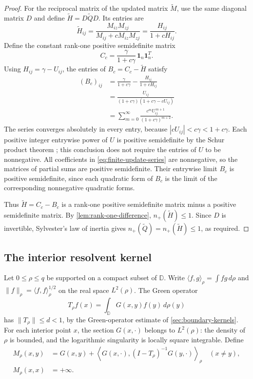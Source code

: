 \begin{proof}
For the reciprocal matrix of the updated matrix $\widetilde M$,
use the same diagonal matrix $D$ and define
$\widetilde H=D\widetilde QD$. Its entries are
\[
 \widetilde H_{ij}
 =\frac{M_{iz}M_{zj}}{M_{ij}+cM_{iz}M_{zj}}
 =\frac{H_{ij}}{1+cH_{ij}}.
\]
Define the constant rank-one positive semidefinite matrix
\[
 C_c=\frac{\gamma}{1+c\gamma}\,
                    \mathbf1_n\mathbf1_n^T.
\]
Using $H_{ij}=\gamma-U_{ij}$, the entries of
$B_c=C_c-\widetilde H$ satisfy
\begin{equation}\label{eq:finite-update-series}
 \begin{aligned}
 (B_c)_{ij}
 &=\frac{\gamma}{1+c\gamma}
                -\frac{H_{ij}}{1+cH_{ij}}\\
 &=\frac{U_{ij}}
        {(1+c\gamma)(1+c\gamma-cU_{ij})}\\
 &=\sum_{m=0}^\infty
       \frac{c^m U_{ij}^{\,m+1}}{(1+c\gamma)^{m+2}}.
 \end{aligned}
\end{equation}
The series converges absolutely in every entry, because
$|cU_{ij}|<c\gamma<1+c\gamma$.
Each positive integer entrywise power of $U$ is positive semidefinite
by the Schur product theorem
\cite[Proposition 17.5]{GallierQuaintance}; this conclusion does not
require the entries of $U$ to be nonnegative. All coefficients
in \cref{eq:finite-update-series} are nonnegative, so the matrices
of partial sums are positive semidefinite. Their entrywise limit
$B_c$ is positive semidefinite, since each quadratic form of $B_c$
is the limit of the corresponding nonnegative quadratic forms.

Thus $\widetilde H=C_c-B_c$ is a rank-one positive semidefinite
matrix minus a positive semidefinite matrix.
By \cref{lem:rank-one-difference}, $n_+(\widetilde H)\le1$.
Since $D$ is invertible, Sylvester's law of inertia gives
$n_+(\widetilde Q)=n_+(\widetilde H)\le1$, as required.
\end{proof}

\subsection{The interior resolvent kernel}\label{sec:interior-resolvent}

Let $0\le\rho\le q$ be supported on a compact subset of $\mathbb D$.
Write $\langle f,g\rangle_\rho=\int fg\,d\rho$ and
$\|f\|_\rho=\langle f,f\rangle_\rho^{1/2}$ on the real space
$L^2(\rho)$. The Green operator
\[
 T_\rho f(x)=\int_{\mathbb D}G(x,y)f(y)\,d\rho(y)
\]
has $\|T_\rho\|\le d<1$, by the Green-operator estimate of \cref{sec:boundary-kernels}.
For each interior point $x$, the section $G(x,\cdot)$ belongs to
$L^2(\rho)$: the density of $\rho$ is bounded, and the logarithmic
singularity is locally square integrable. Define
\begin{equation}\label{eq:interior-resolvent-kernel}
 \begin{aligned}
 M_\rho(x,y)&=G(x,y)+
 \left\langle G(x,\cdot),(I-T_\rho)^{-1}G(y,\cdot)
 \right\rangle_\rho\quad(x\ne y),\\
 M_\rho(x,x)&=+\infty.
 \end{aligned}
\end{equation}

